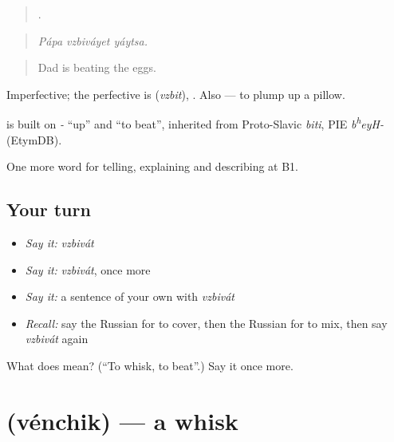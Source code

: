 \begin{quote}
  .
\end{quote}

\begin{quote}
\emph{Pápa vzbiváyet yáytsa.}
\end{quote}

\begin{quote}
Dad is beating the eggs.
\end{quote}

Imperfective; the perfective is \emph{} (\emph{vzbit}), \emph{}. Also \emph{ } — to plump up a pillow.

\begin{cousinweb}
\emph{} is built on \emph{-} \textquotedblleft{}up\textquotedblright{} and \emph{} \textquotedblleft{}to beat\textquotedblright{}, inherited from Proto-Slavic \emph{biti}, PIE \emph{b\textsuperscript{h}eyH-} (EtymDB).
\end{cousinweb}

\begin{grammarlens}[title={What you've built}]
One more word for telling, explaining and describing at B1.
\end{grammarlens}

\subsection*{Your turn}
\begin{itemize}
\raggedright
  \item \emph{Say it:} \emph{vzbivát}
  \item \emph{Say it:} \emph{vzbivát}, once more
  \item \emph{Say it:} a sentence of your own with \emph{vzbivát}
  \item \emph{Recall:} say the Russian for to cover, then the Russian for to mix, then say \emph{vzbivát} again
\end{itemize}

\begin{tcolorbox}[breakable,colback=teal!4,colframe=teal!35!black,title={Before you move on}]
What does  mean? (\textquotedblleft{}To whisk, to beat\textquotedblright{}.) Say it once more.
\end{tcolorbox}
\section[\texorpdfstring{\ru{венчик} (vénchik)}{венчик (vénchik)}]{ (vénchik) — a whisk}

